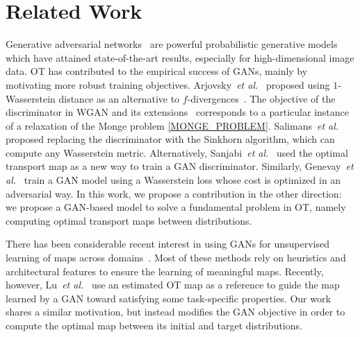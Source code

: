 \documentclass[runningheads]{llncs}
\newcommand\mycitet[1]{\cite{#1}}
\begin{document}
\section{Related Work}

Generative adversarial networks~\cite{goodfellow2014generative} are powerful probabilistic generative models which have attained state-of-the-art results, especially for high-dimensional image data. OT has contributed to the empirical success of GANs, mainly by motivating more robust training objectives. Arjovsky~\emph{et al.}~\mycitet{arjovsky2017wasserstein} proposed using $1$-Wasserstein distance as an alternative to $f$-divergences~\citep{NIPS2016_6066}.
The objective of the discriminator in WGAN and its extensions~\citep{gulrajani2017improved,Miyato2018spectral} corresponds to a particular instance of a relaxation of the Monge problem \eqref{MONGE_PROBLEM}. 
Salimans~\emph{et al.}~\mycitet{Salimans2017otgan} proposed replacing the discriminator with the Sinkhorn algorithm, which can compute any Wasserstein metric. Alternatively, Sanjabi~\emph{et al.}~\mycitet{Sanjabi2018swgan} used the optimal transport map as a new way to train a GAN discriminator. Similarly, Genevay~\emph{et al.}~\mycitet{genevay2017learning} train a GAN model using a Wasserstein loss whose cost is optimized in an adversarial way. In this work, we propose a contribution in the other direction: we propose a GAN-based model to solve a fundamental problem in OT, namely computing optimal transport maps between distributions.

There has been considerable
recent interest in using GANs for unsupervised learning of maps across domains~\cite{zhu2017unpaired,almahairi2018augmented}. Most of these methods rely on heuristics and architectural features to ensure the learning of meaningful maps. 
Recently, however, Lu~\emph{et al.}~\mycitet{lu2018guiding} use an estimated OT map as a reference to guide the map learned by a GAN toward satisfying some task-specific properties. Our work shares a similar motivation, but instead modifies the GAN objective in order to compute the optimal map between its initial and target distributions.

\end{document}
